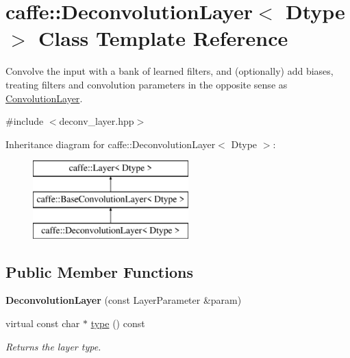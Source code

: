 \hypertarget{classcaffe_1_1DeconvolutionLayer}{}\section{caffe\+:\+:Deconvolution\+Layer$<$ Dtype $>$ Class Template Reference}
\label{classcaffe_1_1DeconvolutionLayer}


Convolve the input with a bank of learned filters, and (optionally) add biases, treating filters and convolution parameters in the opposite sense as \hyperlink{classcaffe_1_1ConvolutionLayer}{Convolution\+Layer}.  




{\ttfamily \#include $<$deconv\+\_\+layer.\+hpp$>$}

Inheritance diagram for caffe\+:\+:Deconvolution\+Layer$<$ Dtype $>$\+:\begin{figure}[H]
\begin{center}
\leavevmode
\includegraphics[height=3.000000cm]{classcaffe_1_1DeconvolutionLayer}
\end{center}
\end{figure}
\subsection*{Public Member Functions}
\begin{DoxyCompactItemize}
\item 
{\bfseries Deconvolution\+Layer} (const Layer\+Parameter \&param)\hypertarget{classcaffe_1_1DeconvolutionLayer_a48f1d8c75f9fb83d4af78a84cff187e8}{}\label{classcaffe_1_1DeconvolutionLayer_a48f1d8c75f9fb83d4af78a84cff187e8}

\item 
virtual const char $\ast$ \hyperlink{classcaffe_1_1DeconvolutionLayer_a7498a14d8b7afa0bc85abe1dbd719135}{type} () const \hypertarget{classcaffe_1_1DeconvolutionLayer_a7498a14d8b7afa0bc85abe1dbd719135}{}\label{classcaffe_1_1DeconvolutionLayer_a7498a14d8b7afa0bc85abe1dbd719135}

\begin{DoxyCompactList}\small\item\em Returns the layer type. \end{DoxyCompactList}\end{DoxyCompactItemize}

